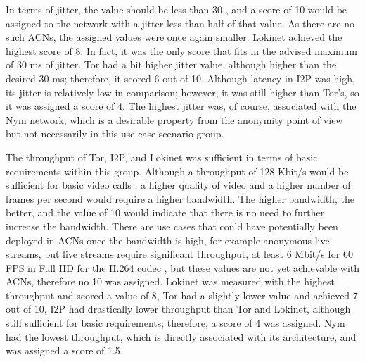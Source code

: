 In terms of jitter, the value should be less than 30 \cite{voip-tor}, and a score of 10 would be assigned to the network with a jitter less than half of that value. As there are no such ACNs, the assigned values were once again smaller. Lokinet achieved the highest score of 8. In fact, it was the only score that fits in the advised maximum of 30 ms of jitter. Tor had a bit higher jitter value, although higher than the desired 30 ms; therefore, it scored 6 out of 10. Although latency in I2P was high, its jitter is relatively low in comparison; however, it was still higher than Tor's, so it was assigned a score of 4. The highest jitter was, of course, associated with the Nym network, which is a desirable property from the anonymity point of view but not necessarily in this use case scenario group.

The throughput of Tor, I2P, and Lokinet was sufficient in terms of basic requirements within this group. Although a throughput of 128 Kbit/s would be sufficient for basic video calls \cite{microsoft-skype-bandwidth}, a higher quality of video and a higher number of frames per second would require a higher bandwidth. The higher bandwidth, the better, and the value of 10 would indicate that there is no need to further increase the bandwidth. There are use cases that could have potentially been deployed in ACNs once the bandwidth is high, for example anonymous live streams, but live streams require significant throughput, at least 6 Mbit/s for 60 FPS in Full HD for the H.264 codec \cite{youtube-streaming}, but these values are not yet achievable with ACNs, therefore no 10 was assigned. Lokinet was measured with the highest throughput and scored a value of 8, Tor had a slightly lower value and achieved 7 out of 10, I2P had drastically lower throughput than Tor and Lokinet, although still sufficient for basic requirements; therefore, a score of 4 was assigned. Nym had the lowest throughput, which is directly associated with its architecture, and was assigned a score of 1.5.

